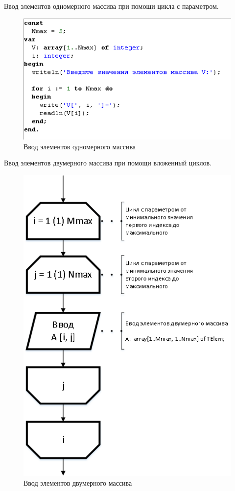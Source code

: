 \documentclass{beamer}
\begin{document}
\begin{frame}
Ввод элементов одномерного массива при помощи цикла с параметром.
\begin{figure}[h]
\centering
\includegraphics[scale=1.0]{images/array_input_code_one.png}
\caption{Ввод элементов одномерного массива}
\label{pic-input-one-index-code}
\end{figure}
\end{frame}

\begin{frame}
Ввод элементов двумерного массива при помощи вложенный циклов.
\begin{figure}[h]
\centering
\includegraphics[scale=0.45]{images/array_input_two.png}
\caption{Ввод элементов двумерного массива}
\label{pic-input-two-index}
\end{figure}
\end{frame}
\end{document}
